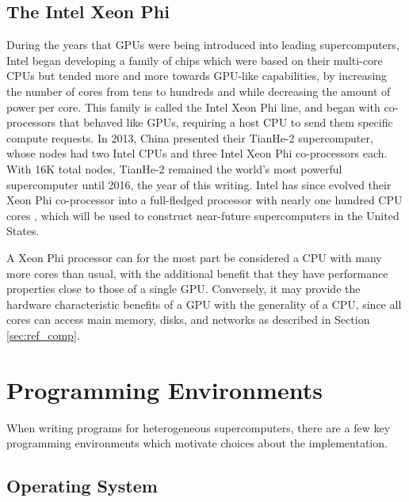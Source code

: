 \subsection{The Intel Xeon Phi}

During the years that GPUs were being introduced into leading supercomputers,
Intel began developing a family of chips which were based on
their multi-core CPUs but tended more and more towards GPU-like capabilities,
by increasing the number of cores from tens to hundreds and while decreasing
the amount of power per core.
This family is called the Intel Xeon Phi line, and began with co-processors
that behaved like GPUs, requiring a host CPU to send them specific compute
requests.
In 2013, China presented their TianHe-2 supercomputer, whose nodes had two Intel
CPUs and three Intel Xeon Phi co-processors each.
With 16K total nodes, TianHe-2 remained the world's most powerful supercomputer
until 2016, the year of this writing.
Intel has since evolved their Xeon Phi co-processor into a full-fledged
processor with nearly one hundred CPU cores \cite{jeffers2013intel},
which will be used to construct near-future supercomputers in the United States.

A Xeon Phi processor can for the most part be considered a CPU with
many more cores than usual, with the additional benefit that they have
performance properties close to those of a single GPU.
Conversely, it may provide the hardware characteristic benefits of a GPU
with the generality of a CPU, since all cores can access main memory,
disks, and networks as described in Section \ref{sec:ref_comp}.

\section{Programming Environments}

When writing programs for heterogeneous supercomputers,
there are a few key programming environments which motivate
choices about the implementation.

\subsection{Operating System}

